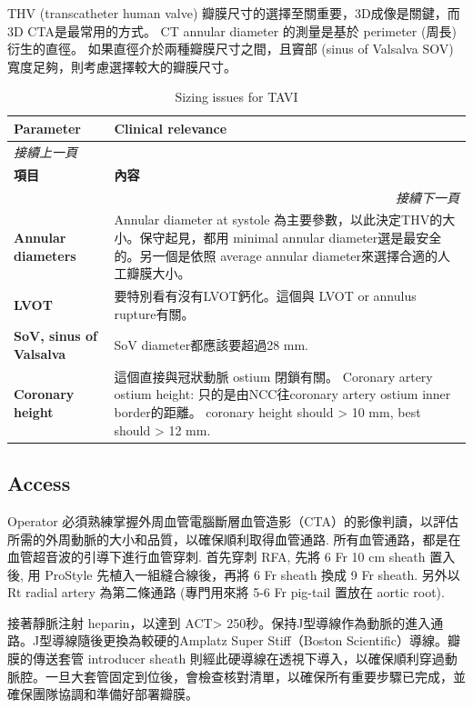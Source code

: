 \documentclass[nols]{tufte-book}
\begin{document}
THV (transcatheter human valve) 瓣膜尺寸的選擇至關重要，3D成像是關鍵，而3D CTA是最常用的方式。
CT annular diameter 的測量是基於 perimeter (周長)衍生的直徑。
如果直徑介於兩種瓣膜尺寸之間，且竇部 (sinus of Valsalva SOV) 寬度足夠，則考慮選擇較大的瓣膜尺寸。

\begin{longtable}{p{3cm} p{7cm}}
\caption{Sizing issues for TAVI}\\
\hline
\textbf{Parameter} & \textbf{Clinical relevance} \\
\hline
\endfirsthead
\multicolumn{2}{l}{\textit{接續上一頁}} \\
\hline
\textbf{項目} & \textbf{內容} \\
\hline
\endhead
\hline \multicolumn{2}{r}{\textit{接續下一頁}} \\
\endfoot
\endlastfoot

\textbf{Annular diameters} & 
Annular diameter at systole 為主要參數，以此決定THV的大小。保守起見，都用 minimal annular diameter選是最安全的。另一個是依照 average annular diameter來選擇合適的人工瓣膜大小。
\\ \hline

\textbf{LVOT} & 
要特別看有沒有LVOT鈣化。這個與 LVOT or annulus rupture有關。
\\ \hline

\textbf{SoV, sinus of Valsalva} &
SoV diameter都應該要超過28 mm. 
\\ \hline

\textbf{Coronary height} &
這個直接與冠狀動脈 ostium 閉鎖有關。
Coronary artery ostium height: 只的是由NCC往coronary artery ostium inner border的距離。
coronary height should > 10 mm, best should > 12 mm. 
\\ \hline

\end{longtable}


\subsection{Access}
Operator 必須熟練掌握外周血管電腦斷層血管造影（CTA）的影像判讀，以評估所需的外周動脈的大小和品質，以確保順利取得血管通路. 
所有血管通路，都是在血管超音波的引導下進行血管穿刺. 
首先穿刺 RFA, 先將 6 Fr 10 cm sheath 置入後, 用 ProStyle 先植入一組縫合線後，再將 6 Fr sheath 換成 9 Fr sheath. 
另外以 Rt radial artery 為第二條通路 (專門用來將 5-6 Fr pig-tail 置放在 aortic root).

接著靜脈注射 heparin，以達到 ACT> 250秒。保持J型導線作為動脈的進入通路。J型導線隨後更換為較硬的Amplatz Super Stiff（Boston Scientific）導線。瓣膜的傳送套管 introducer sheath 則經此硬導線在透視下導入，以確保順利穿過動脈腔。一旦大套管固定到位後，會檢查核對清單，以確保所有重要步驟已完成，並確保團隊協調和準備好部署瓣膜。
\end{document}
